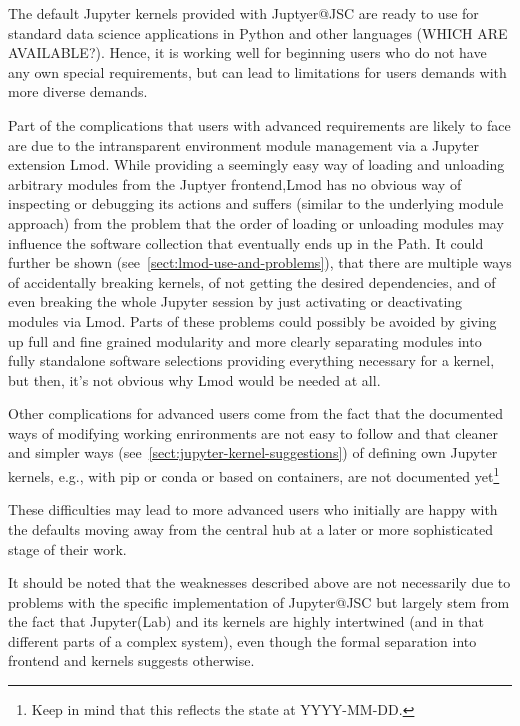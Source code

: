 The default Jupyter kernels provided with Juptyer@JSC are ready to use for standard data science applications in Python and other languages (WHICH ARE AVAILABLE?).
Hence, it is working well for beginning users who do not have any own special requirements, but can lead to limitations for users demands with more diverse demands.

Part of the complications that users with advanced requirements are likely to face are due to the intransparent environment module management via a Jupyter extension Lmod.
While providing a seemingly easy way of loading and unloading arbitrary modules from the Juptyer frontend,Lmod has no obvious way of inspecting or debugging its actions and suffers (similar to the underlying module approach) from the problem that the order of loading or unloading modules may influence the software collection that eventually ends up in the Path.
It could further be shown (see~\ref{sect:lmod-use-and-problems}), that there are multiple ways of accidentally breaking kernels, of not getting the desired dependencies, and of even breaking the whole Jupyter session by just activating or deactivating modules via Lmod.
Parts of these problems could possibly be avoided by giving up full and fine grained modularity and more clearly separating modules into fully standalone software selections providing everything necessary for a kernel, but then, it's not obvious why Lmod would be needed at all.

Other complications for advanced users come from the fact that the documented ways of modifying working enrironments are not easy to follow and that cleaner and simpler ways (see~\ref{sect:jupyter-kernel-suggestions}) of defining own Jupyter kernels, e.g., with pip or conda or based on containers, are not documented yet\footnote{Keep in mind that this reflects the state at YYYY-MM-DD.}

These difficulties may lead to more advanced users who initially are happy with the defaults moving away from the central hub at a later or more sophisticated stage of their work.

It should be noted that the weaknesses described above are not necessarily due to problems with the specific implementation of Jupyter@JSC but largely stem from the fact that Jupyter(Lab) and its kernels are highly intertwined (and in that different parts of a complex system), even though the formal separation into frontend and kernels suggests otherwise.


